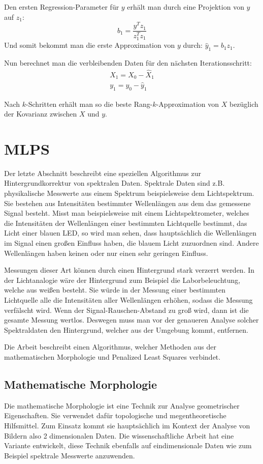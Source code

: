 \documentclass{article}
\begin{document}
Den ersten Regression-Parameter für $y$ erhält man durch eine Projektion von $y$ auf $z_1$:
\begin{equation*}
    b_1 = \frac{y^Tz_1}{z_1^Tz_1}
\end{equation*}
Und somit bekommt man die erste Approximation von $y$ durch: $\hat{y}_1 = b_1z_1$.

Nun berechnet man die verbleibenden Daten für den nächsten Iterationsschritt:
\begin{align*}
    X_1 = X_0 - \hat{X}_1 \\
    y_1 = y_0 - \hat{y}_1
\end{align*}

Nach $k$-Schritten erhält man so die beste Rang-$k$-Approximation von $X$ bezüglich der Kovarianz zwischen $X$ und $y$.

\section{MLPS}

Der letzte Abschnitt beschreibt eine speziellen Algorithmus zur Hintergrundkorrektur von spektralen Daten.
Spektrale Daten sind z.B. physikalische Messwerte aus einem Spektrum beispielsweise dem Lichtspektrum. 
Sie bestehen aus Intensitäten bestimmter Wellenlängen aus dem das gemessene Signal besteht. 
Misst man beispielsweise mit einem Lichtspektrometer, welches die Intensitäten der Wellenlängen einer bestimmten Lichtquelle bestimmt, das Licht einer blauen LED,
so wird man sehen, dass hauptsächlich die Wellenlängen im Signal einen großen Einfluss haben, die blauem Licht zuzuordnen sind. Andere Wellenlängen haben keinen oder nur einen sehr geringen Einfluss.

Messungen dieser Art können durch einen Hintergrund stark verzerrt werden. In der Lichtanalogie wäre der Hintergrund zum Beispiel die Laborbeleuchtung, welche aus weißen besteht. 
Sie würde in der Messung einer bestimmten Lichtquelle alle die Intensitäten aller Wellenlängen erhöhen, sodass die Messung verfälscht wird.
Wenn der Signal-Rauschen-Abstand zu groß wird, dann ist die gesamte Messung wertlos. Deswegen muss man vor der genaueren Analyse solcher Spektraldaten den Hintergrund, welcher aus der Umgebung kommt, entfernen.

Die Arbeit beschreibt einen Algorithmus, welcher Methoden aus der mathematischen Morphologie und Penalized Least Squares verbindet.

\subsection{Mathematische Morphologie}
Die mathematische Morphologie ist eine Technik zur Analyse geometrischer Eigenschaften.
Sie verwendet dafür topologische und megentheoretische Hilfsmittel. Zum Einsatz kommt sie hauptsächlich im Kontext der Analyse von Bildern also 2 dimensionalen Daten.
Die wissenschaftliche Arbeit hat eine Variante entwickelt, diese Technik ebenfalls auf eindimensionale Daten wie zum Beispiel spektrale Messwerte anzuwenden.
\end{document}
